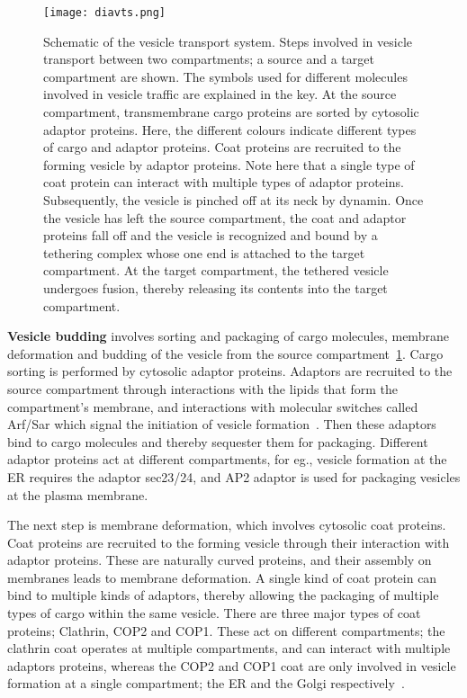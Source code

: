 \begin{figure}
	\texttt{[image: diavts.png]}
	\caption{Schematic of the vesicle transport system. Steps involved in vesicle transport between two compartments; a source and a target compartment are shown. 
	The symbols used for different molecules involved in vesicle traffic are explained in the key. At the source compartment, transmembrane cargo proteins are sorted by cytosolic adaptor proteins. 
	Here, the different colours indicate different types of cargo and adaptor proteins. Coat proteins are recruited to the forming vesicle by adaptor proteins. 
	Note here that a single type of coat protein can interact with multiple types of adaptor proteins. Subsequently, the vesicle is pinched off at its neck by dynamin. 
	Once the vesicle has left the source compartment, the coat and adaptor proteins fall off and the vesicle is recognized and bound by a tethering complex whose one end is attached to the target compartment. At the target compartment, the tethered vesicle undergoes fusion, thereby releasing its contents into the target compartment.}
    \label{fig:vts}
\end{figure}

\textbf{Vesicle budding} involves sorting and packaging of cargo molecules, membrane deformation and budding of the vesicle from the source compartment~\ref{fig:vts}.
%
Cargo sorting is performed by cytosolic adaptor proteins. 
Adaptors are recruited to the source compartment through interactions with the lipids that form the compartment's membrane, and interactions with molecular switches called Arf/Sar which signal the initiation of vesicle formation~\cite{paczkowski2015cargo}. Then these adaptors bind to cargo molecules and thereby sequester them for packaging. 
%
Different adaptor proteins act at different compartments, for eg., vesicle formation at the ER requires the adaptor sec23/24, and AP2 adaptor is used for packaging vesicles at the plasma membrane.
%

The next step is membrane deformation, which involves cytosolic coat proteins. Coat proteins are recruited to the forming vesicle through their interaction with adaptor proteins. These are naturally curved proteins, and their assembly on membranes leads to membrane deformation.
A single kind of coat protein can bind to multiple kinds of adaptors, thereby allowing the packaging of multiple types of cargo within the same vesicle. 
%
There are three major types of coat proteins; Clathrin, COP2 and COP1. These act on different compartments; the clathrin coat operates at multiple compartments, and can interact with multiple adaptors proteins, whereas the COP2 and COP1 coat are only involved in vesicle formation at a single compartment; the ER and the Golgi respectively~\cite{faini2013vesicle}.

